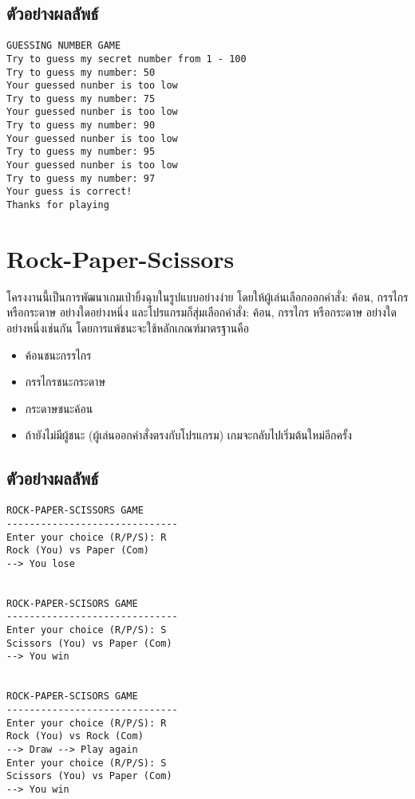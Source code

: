 \documentclass[a4paper]{article}
\begin{document}
\inputminted{python}{guessing_number.py}

\subsection*{ตัวอย่างผลลัพธ์}

\begin{verbatim}
GUESSING NUMBER GAME
Try to guess my secret number from 1 - 100
Try to guess my number: 50
Your guessed nunber is too low
Try to guess my number: 75
Your guessed nunber is too low
Try to guess my number: 90
Your guessed nunber is too low
Try to guess my number: 95
Your guessed nunber is too low
Try to guess my number: 97
Your guess is correct!
Thanks for playing    
\end{verbatim}

\cleardoublepage
\section{Rock-Paper-Scissors}
โครงงานนี้เป็นการพัฒนาเกมเป่ายิ้งฉุบในรูปแบบอย่างง่าย โดยให้ผู้เล่นเลือกออกคำสั่ง: ค้อน, กรรไกร หรือกระดาษ อย่างใดอย่างหนึ่ง และโปรแกรมก็สุ่มเลือกคำสั่ง: ค้อน, กรรไกร หรือกระดาษ อย่างใดอย่างหนึ่งเช่นกัน โดยการแพ้ชนะจะใช้หลักเกณฑ์มาตรฐานคือ
\begin{itemize}
    \item ค้อนชนะกรรไกร
    \item กรรไกรชนะกระดาษ
    \item กระดาษชนะค้อน
    \item ถ้ายังไม่มีผู้ชนะ (ผู้เล่นออกคำสั่งตรงกับโปรแกรม) เกมจะกลับไปเริ่มต้นใหม่อีกครั้ง
\end{itemize}

\subsection*{ตัวอย่างผลลัพธ์}

\begin{verbatim}
ROCK-PAPER-SCISSORS GAME
------------------------------
Enter your choice (R/P/S): R
Rock (You) vs Paper (Com)
--> You lose


ROCK-PAPER-SCISORS GAME
------------------------------
Enter your choice (R/P/S): S
Scissors (You) vs Paper (Com)
--> You win


ROCK-PAPER-SCISORS GAME
------------------------------
Enter your choice (R/P/S): R
Rock (You) vs Rock (Com)
--> Draw --> Play again
Enter your choice (R/P/S): S
Scissors (You) vs Paper (Com)
--> You win
\end{verbatim}
\end{document}

